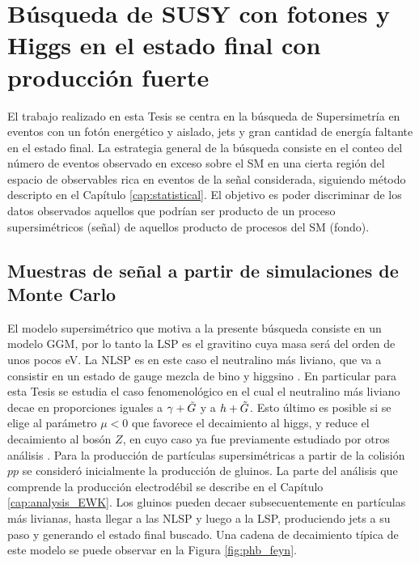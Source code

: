 \chapter{Búsqueda de SUSY con fotones y Higgs en el estado final con producción fuerte}




El trabajo realizado en esta Tesis se centra en la búsqueda de Supersimetría en eventos con un fotón energético y aislado, jets y gran cantidad de energía faltante en el estado final. La estrategia general de la búsqueda consiste en el conteo del número de eventos observado en exceso sobre el SM en una cierta región del espacio de observables rica en eventos de la señal considerada, siguiendo método descripto en el Capítulo \ref{cap:statistical}. El objetivo es poder discriminar de los datos observados aquellos que podrían ser producto de un proceso supersimétricos (señal) de aquellos producto de procesos del SM (fondo).


\section{Muestras de señal a partir de simulaciones de Monte Carlo}

El modelo supersimétrico que motiva a la presente búsqueda consiste en un modelo GGM, por lo tanto la LSP es el gravitino cuya masa será del orden de unos pocos eV. La NLSP es en este caso el neutralino más liviano, que va a consistir en un estado de gauge mezcla de bino y higgsino
. En particular para esta Tesis se estudia el caso fenomenológico en el cual el neutralino más liviano decae en proporciones iguales a $\gamma+\tilde{G}$ y a $h+\tilde{G}$. Esto último es posible si se elige al parámetro $\mu<0$ que favorece el decaimiento al higgs, y reduce el decaimiento al bosón $Z$, en cuyo caso ya fue previamente estudiado por otros análisis \cite{tesis_fran, tesis_joaco}. Para la producción de partículas supersimétricas a partir de la colisión $pp$ se consideró inicialmente la producción de gluinos. La parte del análisis que comprende la producción electrodébil se describe en el Capítulo \ref{cap:analysis_EWK}. Los gluinos pueden decaer subsecuentemente en partículas más livianas, hasta llegar a las NLSP y luego a la LSP, produciendo jets a su paso y generando el estado final buscado. Una cadena de decaimiento típica de este modelo se puede observar en la Figura \ref{fig:phb_feyn}.

